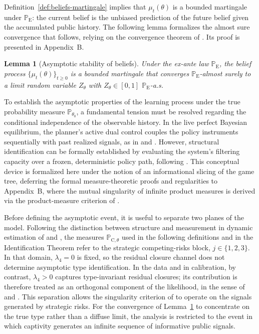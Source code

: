 \documentclass[review,authoryear,12pt]{elsarticle}
\theoremstyle{plain}
\newtheorem{lemma}[theorem]{Lemma}
\theoremstyle{definition}
\newcommand{\ProbE}{\mathbb{P}_{\mathrm{E}}}
\newcommand{\ProbC}[1]{\mathbb{P}_{\mathrm{C},#1}}
\newcommand{\1}{\mathbf{1}}
\begin{document}
Definition~\ref{def:beliefs-martingale} implies that $\mu_t(\theta)$ is a bounded martingale under $\ProbE$: the current belief is the unbiased prediction of the future belief given the accumulated public history. The following lemma formalizes the almost sure convergence that follows, relying on the convergence theorem of \citet{Doob1953Stochastic}. Its proof is presented in Appendix~B.

\begin{lemma}[Asymptotic stability of beliefs]\label{lem:asymptotic-beliefs}
Under the ex-ante law $\ProbE$, the belief process $\{\mu_t(\theta)\}_{t\ge 0}$ is a bounded martingale that converges $\ProbE$-almost surely to a limit random variable $Z_\theta$ with $Z_\theta\in[0,1]$ $\ProbE$-a.s.
\end{lemma}

\smallskip

To establish the asymptotic properties of the learning process under the true probability measure $\mathbb{P}_{\theta_0}$, a fundamental tension must be resolved regarding the conditional independence of the observable history. In the live perfect Bayesian equilibrium, the planner's active dual control couples the policy instruments sequentially with past realized signals, as in \citet{AghionBoltonHarrisJullien1991} and \citet{EasleyKiefer1988}. However, structural identification can be formally established by evaluating the system's filtering capacity over a frozen, deterministic policy path, following \citet{BlackwellDubins1962}. This conceptual device is formalized here under the notion of an informational slicing of the game tree, deferring the formal measure-theoretic proofs and regularities to Appendix~B, where the mutual singularity of infinite product measures is derived via the product-measure criterion of \citet{Kakutani1948}.

Before defining the asymptotic event, it is useful to separate two planes of the model. Following the distinction between structure and measurement in dynamic estimation of \citet{Rust1987} and \citet{MagnacThesmar2002}, the measures $\ProbC{\theta}$ used in the following definitions and in the Identification Theorem refer to the strategic competing-risks block, $j\in\{1,2,3\}$. In that domain, $\lambda_4=0$ is fixed, so the residual closure channel does not determine asymptotic type identification. In the data and in calibration, by contrast, $\lambda_4>0$ captures type-invariant residual closures; its contribution is therefore treated as an orthogonal component of the likelihood, in the sense of \citet{Lancaster1990} and \citet{AbbringVanDenBerg2003}. This separation allows the singularity criterion of \citet{Kakutani1948} to operate on the signals generated by strategic risks. For the convergence of Lemma~\ref{lem:asymptotic-beliefs} to concentrate on the true type rather than a diffuse limit, the analysis is restricted to the event in which captivity generates an infinite sequence of informative public signals.
\end{document}
